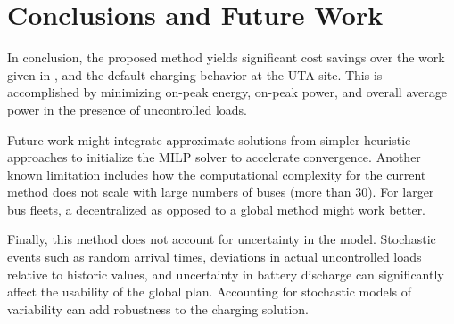 \section{Conclusions and Future Work }
In conclusion, the proposed method yields significant cost savings over the work given in \cite{He_2019_Fast}, and the default charging behavior at the UTA site. This is accomplished by minimizing on-peak energy, on-peak power, and overall average power in the presence of uncontrolled loads. 
\par Future work might integrate approximate solutions from simpler heuristic approaches to initialize the MILP solver to accelerate convergence. Another known limitation includes how the computational complexity for the current method does not scale with large numbers of buses (more than 30). For larger bus fleets, a decentralized as opposed to a global method might work better. 
\par Finally, this method does not account for uncertainty in the model.  Stochastic events such as random arrival times, deviations in actual uncontrolled loads relative to historic values, and uncertainty in battery discharge can significantly affect the usability of the global plan. Accounting for stochastic models of variability can add robustness to the charging solution.  

